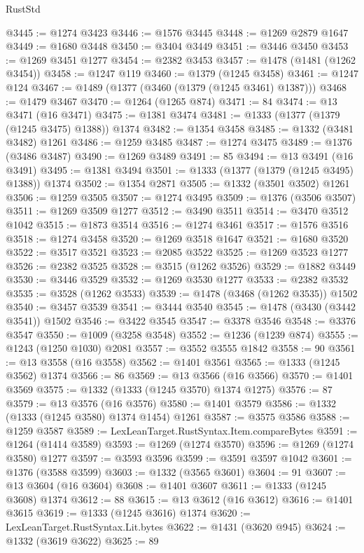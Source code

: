 \begin{lexlean}{RustStd}
\begin{coremodule}
@3445 := @1274 @3423
@3446 := @1576 @3445
@3448 := @1269 @2879 @1647
@3449 := @1680 @3448
@3450 := @3404 @3449
@3451 := @3446 @3450
@3453 := @1269 @3451 @1277
@3454 := @2382 @3453
@3457 := @1478 (@1481 (@1262 @3454))
@3458 := @1247 @119
@3460 := @1379 (@1245 @3458)
@3461 := @1247 @124
@3467 := @1489 (@1377 (@3460 (@1379 (@1245 @3461) @1387)))
@3468 := @1479 @3467
@3470 := @1264 (@1265 @874)
@3471 := 84
@3474 := @13 @3471 (@16 @3471)
@3475 := @1381 @3474
@3481 := @1333 (@1377 (@1379 (@1245 @3475) @1388)) @1374
@3482 := @1354 @3458
@3485 := @1332 (@3481 @3482) @1261
@3486 := @1259 @3485
@3487 := @1274 @3475
@3489 := @1376 (@3486 @3487)
@3490 := @1269 @3489
@3491 := 85
@3494 := @13 @3491 (@16 @3491)
@3495 := @1381 @3494
@3501 := @1333 (@1377 (@1379 (@1245 @3495) @1388)) @1374
@3502 := @1354 @2871
@3505 := @1332 (@3501 @3502) @1261
@3506 := @1259 @3505
@3507 := @1274 @3495
@3509 := @1376 (@3506 @3507)
@3511 := @1269 @3509 @1277
@3512 := @3490 @3511
@3514 := @3470 @3512 @1042
@3515 := @1873 @3514
@3516 := @1274 @3461
@3517 := @1576 @3516
@3518 := @1274 @3458
@3520 := @1269 @3518 @1647
@3521 := @1680 @3520
@3522 := @3517 @3521
@3523 := @2085 @3522
@3525 := @1269 @3523 @1277
@3526 := @2382 @3525
@3528 := @3515 (@1262 @3526)
@3529 := @1882 @3449
@3530 := @3446 @3529
@3532 := @1269 @3530 @1277
@3533 := @2382 @3532
@3535 := @3528 (@1262 @3533)
@3539 := @1478 (@3468 (@1262 @3535)) @1502
@3540 := @3457 @3539
@3541 := @3444 @3540
@3545 := @1478 (@3430 (@3442 @3541)) @1502
@3546 := @3422 @3545
@3547 := @3378 @3546
@3548 := @3376 @3547
@3550 := @1009 (@3258 @3548)
@3552 := @1236 (@1239 @874)
@3555 := @1243 (@1250 @1030) @2081
@3557 := @3552 @3555 @1842
@3558 := 90
@3561 := @13 @3558 (@16 @3558)
@3562 := @1401 @3561
@3565 := @1333 (@1245 @3562) @1374
@3566 := 86
@3569 := @13 @3566 (@16 @3566)
@3570 := @1401 @3569
@3575 := @1332 (@1333 (@1245 @3570) @1374 @1275)
@3576 := 87
@3579 := @13 @3576 (@16 @3576)
@3580 := @1401 @3579
@3586 := @1332 (@1333 (@1245 @3580) @1374 @1454) @1261
@3587 := @3575 @3586
@3588 := @1259 @3587
@3589 := LexLeanTarget.RustSyntax.Item.compareBytes
@3591 := @1264 (@1414 @3589)
@3593 := @1269 (@1274 @3570)
@3596 := @1269 (@1274 @3580) @1277
@3597 := @3593 @3596
@3599 := @3591 @3597 @1042
@3601 := @1376 (@3588 @3599)
@3603 := @1332 (@3565 @3601)
@3604 := 91
@3607 := @13 @3604 (@16 @3604)
@3608 := @1401 @3607
@3611 := @1333 (@1245 @3608) @1374
@3612 := 88
@3615 := @13 @3612 (@16 @3612)
@3616 := @1401 @3615
@3619 := @1333 (@1245 @3616) @1374
@3620 := LexLeanTarget.RustSyntax.Lit.bytes
@3622 := @1431 (@3620 @945)
@3624 := @1332 (@3619 @3622)
@3625 := 89

\end{coremodule}
\end{lexlean}
